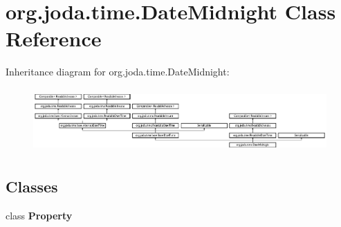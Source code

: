 \hypertarget{classorg_1_1joda_1_1time_1_1_date_midnight}{\section{org.\-joda.\-time.\-Date\-Midnight Class Reference}
\label{classorg_1_1joda_1_1time_1_1_date_midnight}
}
Inheritance diagram for org.\-joda.\-time.\-Date\-Midnight\-:\begin{figure}[H]
\begin{center}
\leavevmode
\includegraphics[height=2.466960cm]{classorg_1_1joda_1_1time_1_1_date_midnight}
\end{center}
\end{figure}
\subsection*{Classes}
\begin{DoxyCompactItemize}
\item 
class {\bfseries Property}
\end{DoxyCompactItemize}
